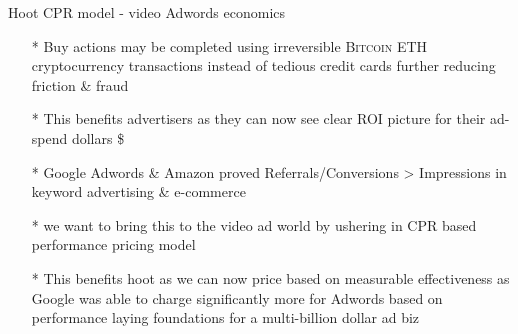 \documentclass[10pt]{beamer}
\begin{document}
\begin{frame}[t]{Hoot CPR model - video Adwords economics}
\begin{itemize}[<+-| alert@+>]

\item[*]Buy actions may be completed using irreversible  \textsc{Bitcoin ETH} cryptocurrency transactions instead of tedious credit cards further reducing friction \& fraud
\item[*]This benefits advertisers as they can now see clear ROI picture for their ad-spend dollars \$
\item[*]Google Adwords \& Amazon proved Referrals/Conversions > Impressions in keyword advertising \& e-commerce
\item[*]we want to bring this to the video ad world by ushering in CPR based performance pricing model
\item[*]This benefits hoot as we can now price based on measurable effectiveness as Google was able to charge significantly more for Adwords based on performance laying foundations for a multi-billion dollar ad biz

\end{itemize}
\end{frame}
\end{document}
